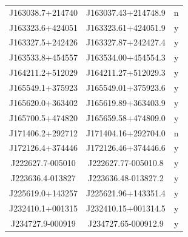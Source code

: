\begin{table}
\begin{tabular}{ccc}
        J163038.7+214740 & J163037.43+214748.9 & n\\
        J163323.6+424051 & J163323.61+424051.9 & y\\
        J163327.5+242426 & J163327.87+242427.4 & y\\
        J163533.8+454557 & J163534.00+454554.3 & y\\
        J164211.2+512029 & J164211.27+512029.3 & y\\
        J165549.1+375923 & J165549.01+375923.6 & y\\
        J165620.0+363402 & J165619.89+363403.9 & y\\
        J165700.5+474820 & J165659.58+474809.0 & y\\
        J171406.2+292712 & J171404.16+292704.0 & n\\
        J172126.4+374446 & J172126.46+374446.6 & y\\
        J222627.7-005010 & J222627.77-005010.8 & y\\
        J223636.4-013827 & J223636.48-013827.2 & y\\
        J225619.0+143257 & J225621.96+143351.4 & y\\
        J232410.1+001315 & J232410.15+001314.5 & y\\
        J234727.9-000919 & J234727.65-000912.9 & y\\\hline
  \end{tabular}
\end{table}


\unappendix